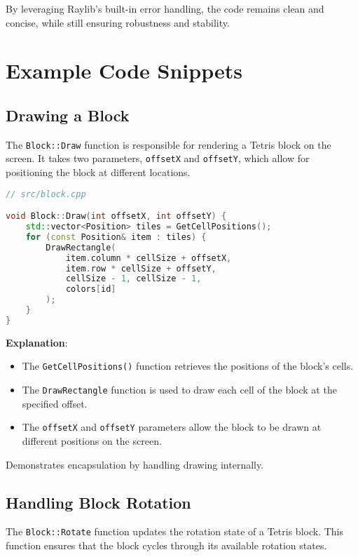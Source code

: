 \documentclass{article}
\begin{document}
By leveraging Raylib's built-in error handling, the code remains clean and concise, while still ensuring robustness and stability.

\section{Example Code Snippets}

\subsection{Drawing a Block}
The \texttt{Block::Draw} function is responsible for rendering a Tetris block on the screen. It takes two parameters, \texttt{offsetX} and \texttt{offsetY}, which allow for positioning the block at different locations.

\begin{lstlisting}[language=C++]
// src/block.cpp

void Block::Draw(int offsetX, int offsetY) {
    std::vector<Position> tiles = GetCellPositions();
    for (const Position& item : tiles) {
        DrawRectangle(
            item.column * cellSize + offsetX,
            item.row * cellSize + offsetY,
            cellSize - 1, cellSize - 1,
            colors[id]
        );
    }
}
\end{lstlisting}

\textbf{Explanation}:

\begin{itemize}
    \item The \texttt{GetCellPositions()} function retrieves the positions of the block's cells.
    \item The \texttt{DrawRectangle} function is used to draw each cell of the block at the specified offset.
    \item The \texttt{offsetX} and \texttt{offsetY} parameters allow the block to be drawn at different positions on the screen.
\end{itemize}

Demonstrates encapsulation by handling drawing internally.

\subsection{Handling Block Rotation}

The \texttt{Block::Rotate} function updates the rotation state of a Tetris block. This function ensures that the block cycles through its available rotation states.
\end{document}
